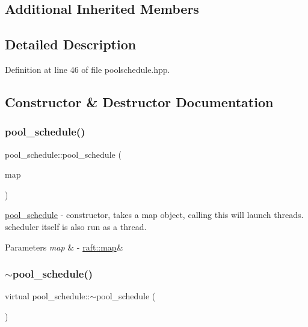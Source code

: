 \subsection*{Additional Inherited Members}


\subsection{Detailed Description}


Definition at line 46 of file poolschedule.\+hpp.



\subsection{Constructor \& Destructor Documentation}
\hypertarget{classpool__schedule_ab5d4103fd0a752a1a8207dbef883edb8}{}\label{classpool__schedule_ab5d4103fd0a752a1a8207dbef883edb8} 
\subsubsection{\texorpdfstring{pool\+\_\+schedule()}{pool\_schedule()}}
{\footnotesize\ttfamily pool\+\_\+schedule\+::pool\+\_\+schedule (\begin{DoxyParamCaption}\item[{\hyperlink{classraft_1_1map}{raft\+::map} \&}]{map }\end{DoxyParamCaption})}

\hyperlink{classpool__schedule}{pool\+\_\+schedule} -\/ constructor, takes a map object, calling this will launch threads. scheduler itself is also run as a thread. 
\begin{DoxyParams}{Parameters}
{\em map} & -\/ \hyperlink{classraft_1_1map}{raft\+::map}\& \\
\hline
\end{DoxyParams}
\hypertarget{classpool__schedule_a7185ae96c790733a14b7446826c07d9a}{}\label{classpool__schedule_a7185ae96c790733a14b7446826c07d9a} 
\subsubsection{\texorpdfstring{$\sim$pool\+\_\+schedule()}{~pool\_schedule()}}
{\footnotesize\ttfamily virtual pool\+\_\+schedule\+::$\sim$pool\+\_\+schedule (\begin{DoxyParamCaption}{ }\end{DoxyParamCaption})\hspace{0.3cm}{\ttfamily [virtual]}}

